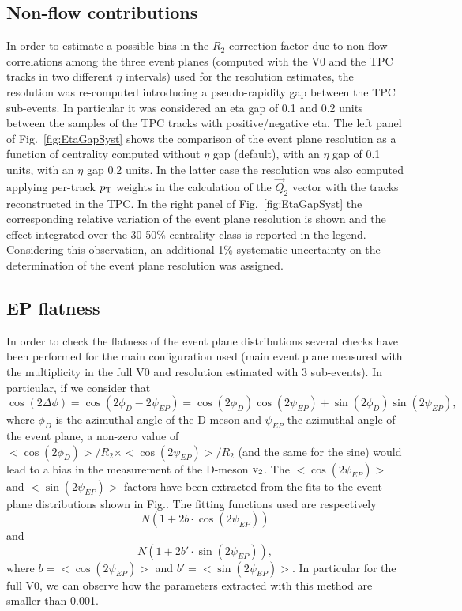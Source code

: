 \subsection{Non-flow contributions}
\label{sec:NonFlow}
In order to estimate a possible bias in the $R_2$ correction factor due to non-flow correlations among the three 
event planes (computed with the V0 and the TPC tracks in two different $\eta$ intervals) used for the resolution estimates,
the resolution was re-computed introducing 
a pseudo-rapidity gap between the TPC sub-events. 
In particular it was considered an eta 
gap of 0.1 and 0.2 units between the samples of the TPC tracks with positive/negative 
eta. The left panel of Fig.~\ref{fig:EtaGapSyst} shows
 the comparison of the event plane resolution 
as a function of centrality computed without $\eta$ gap (default), 
with an $\eta$ gap of 0.1 units, with an $\eta$ gap 0.2 units. 
In the latter case the resolution was also computed 
applying per-track $p_{\rm T}$ weights in the calculation of the $\vec{Q}_2$ vector with
the tracks reconstructed in the TPC.
In the right panel of Fig.~\ref{fig:EtaGapSyst} the corresponding 
relative variation of the event plane resolution is shown and the effect integrated over the 
30-50\% centrality class is reported in the legend. Considering this observation, an additional 1\%
 systematic uncertainty on the determination of the
event plane resolution was assigned.
\iffalse
\subsection{EP flatness}
\label{sec:EPflat}
In order to check the flatness of the event plane 
distributions several checks have been performed 
for the main configuration used (main event plane 
measured with the multiplicity in the full V0 and
 resolution estimated with 3 sub-events). In particular, if we consider that
\begin{equation}
\cos(2\Delta\phi) = \cos(2\phi_D-2\psi_{EP}) = \cos(2\phi_D)\cos(2\psi_{EP})+\sin(2\phi_D)\sin(2\psi_{EP}),
\end{equation}
where $\phi_D$ is the azimuthal angle of the D meson 
and $\psi_{EP}$ the azimuthal angle of the event plane, 
a non-zero value of 
$< \cos(2\phi_D) >/R_2 \times < \cos(2\psi_{EP}) >/R_2$ 
(and the same for the sine) would lead to a bias in the 
measurement of the D-meson $\rm v_2$. The  
$< \cos(2\psi_{EP}) >$ and $< \sin(2\psi_{EP}) >$ factors 
have been extracted from the fits to the event plane 
distributions shown in Fig.. The fitting functions used are respectively 
\begin{equation}
N(1+2b\cdot \cos(2\psi_{EP}))
\end{equation}
and 
\begin{equation}
N(1+2b'\cdot \sin(2\psi_{EP})),
\end{equation}
where $b = < \cos(2\psi_{EP}) >$ and $b' = < \sin(2\psi_{EP}) >$.
In particular for the full V0, we can observe how the parameters 
extracted with this method are smaller than 0.001.


